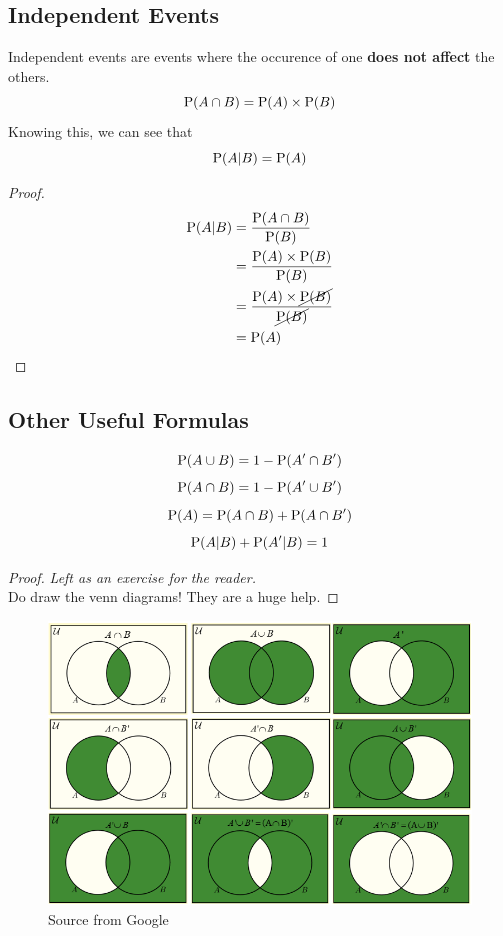 \documentclass[../setup.tex]{subfiles}
\begin{document}
\subsection{Independent Events}
\begin{theorem}
Independent events are events where the occurence of one \textbf{does not affect} the others.
\[ \textup{P}(A \cap B) = \textup{P}(A) \times \textup{P}(B) \]
Knowing this, we can see that
\[ \textup{P}(A | B) = \textup{P}(A) \]
\end{theorem}
\begin{proof}
\begin{align*} 
\textup{P}(A | B) &= \frac{\textup{P}(A \cap B)}{\textup{P}(B)} \\
&= \frac{\textup{P}(A) \times \textup{P}(B)}{\textup{P}(B)} \\
&= \frac{\textup{P}(A) \times \cancel{\textup{P}(B)}}{\cancel{\textup{P}(B)}} \\
&= \textup{P}(A)
\end{align*}
\end{proof}
\clearpage

\subsection{Other Useful Formulas}
\begin{proposition}
\[ \textup{P}(A \cup B) = 1 - \textup{P}(A' \cap B') \]
\[ \textup{P}(A \cap B) = 1 - \textup{P}(A' \cup B') \]
\[ \textup{P}(A) = \textup{P}(A \cap B) + \textup{P}(A \cap B') \]
\[ \textup{P}(A | B) + \textup{P}(A' | B) = 1 \]
\end{proposition}
\begin{proof} 
\textit{Left as an exercise for the reader.} \\
Do draw the venn diagrams! They are a huge help.
\end{proof}

\begin{figure}[H]
    \centering
    \includegraphics[scale=0.6]{Venn Diagram.jpg}
    \caption{Source from Google}
\end{figure}
\end{document}
